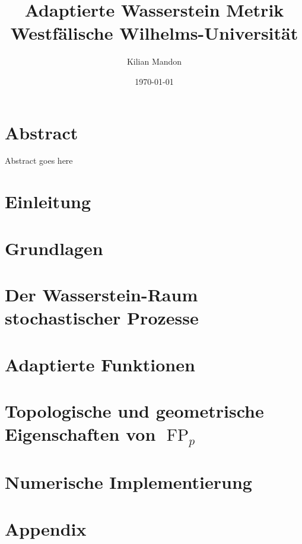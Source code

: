 \documentclass[12pt]{article}
\theoremstyle{definition}
\DeclareMathOperator{\FP}{FP}
\begin{document}
\title{
    {Adaptierte Wasserstein Metrik} \\
    {Westfälische Wilhelms-Universität}
}

\author{Kilian Mandon}
\date{\today}

\maketitle

\section*{Abstract}
Abstract goes here

\section{Einleitung}


\section{Grundlagen}


\section{Der Wasserstein-Raum stochastischer Prozesse}


\section{Adaptierte Funktionen}


\section{Topologische und geometrische Eigenschaften von $\FP_p$}


\section{Numerische Implementierung}


\section{Appendix}

\end{document}
